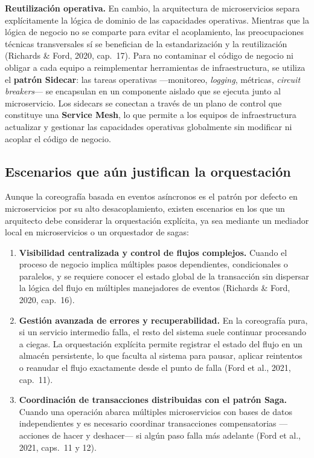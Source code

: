 \documentclass[12pt,a4paper]{article}
\begin{document}
\textbf{Reutilización operativa.} En cambio, la arquitectura de microservicios separa explícitamente la lógica de dominio de las capacidades operativas. Mientras que la lógica de negocio no se comparte para evitar el acoplamiento, las preocupaciones técnicas transversales sí se benefician de la estandarización y la reutilización (Richards \& Ford, 2020, cap.~17). Para no contaminar el código de negocio ni obligar a cada equipo a reimplementar herramientas de infraestructura, se utiliza el \textbf{patrón Sidecar}: las tareas operativas ---monitoreo, \emph{logging}, métricas, \emph{circuit breakers}--- se encapsulan en un componente aislado que se ejecuta junto al microservicio. Los sidecars se conectan a través de un plano de control que constituye una \textbf{Service Mesh}, lo que permite a los equipos de infraestructura actualizar y gestionar las capacidades operativas globalmente sin modificar ni acoplar el código de negocio.

\subsection{Escenarios que aún justifican la orquestación}

Aunque la coreografía basada en eventos asíncronos es el patrón por defecto en microservicios por su alto desacoplamiento, existen escenarios en los que un arquitecto debe considerar la orquestación explícita, ya sea mediante un mediador local en microservicios o un orquestador de sagas:

\begin{enumerate}[label=\arabic*.,leftmargin=*]
  \item \textbf{Visibilidad centralizada y control de flujos complejos.} Cuando el proceso de negocio implica múltiples pasos dependientes, condicionales o paralelos, y se requiere conocer el estado global de la transacción sin dispersar la lógica del flujo en múltiples manejadores de eventos (Richards \& Ford, 2020, cap.~16).
  \item \textbf{Gestión avanzada de errores y recuperabilidad.} En la coreografía pura, si un servicio intermedio falla, el resto del sistema suele continuar procesando a ciegas. La orquestación explícita permite registrar el estado del flujo en un almacén persistente, lo que faculta al sistema para pausar, aplicar reintentos o reanudar el flujo exactamente desde el punto de falla (Ford et al., 2021, cap.~11).
  \item \textbf{Coordinación de transacciones distribuidas con el patrón Saga.} Cuando una operación abarca múltiples microservicios con bases de datos independientes y es necesario coordinar transacciones compensatorias ---acciones de hacer y deshacer--- si algún paso falla más adelante (Ford et al., 2021, caps.~11 y 12).
\end{enumerate}
\end{document}
